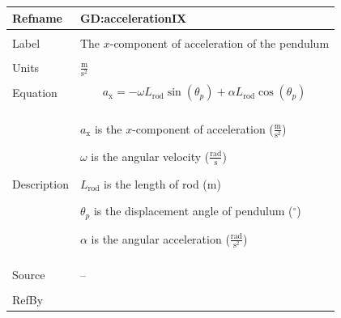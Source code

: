 \documentclass[12pt]{article}
\begin{document}
\vspace{\baselineskip}
\noindent
\begin{minipage}{\textwidth}
\begin{tabular}{>{\raggedright}p{}>{\raggedright\arraybackslash}p{}}
\toprule \textbf{Refname} & \textbf{GD:accelerationIX}
\label{GD:accelerationIX}
\\ \midrule \\
Label & The $x$-component of acceleration of the pendulum
        
\\ \midrule \\
Units & $\frac{\text{m}}{\text{s}^{2}}$
        
\\ \midrule \\
Equation & \begin{displaymath}
           {a_{\text{x}}}=-ω {L_{\text{rod}}} \sin\left({θ_{p}}\right)+α {L_{\text{rod}}} \cos\left({θ_{p}}\right)
           \end{displaymath}
\\ \midrule \\
Description & \begin{symbDescription}
              \item{${a_{\text{x}}}$ is the $x$-component of acceleration ($\frac{\text{m}}{\text{s}^{2}}$)}
              \item{$ω$ is the angular velocity ($\frac{\text{rad}}{\text{s}}$)}
              \item{${L_{\text{rod}}}$ is the length of rod (${\text{m}}$)}
              \item{${θ_{p}}$ is the displacement angle of pendulum (${{}^{\circ}}$)}
              \item{$α$ is the angular acceleration ($\frac{\text{rad}}{\text{s}^{2}}$)}
              \end{symbDescription}
\\ \midrule \\
Source & --
         
\\ \midrule \\
RefBy & 
\\ \bottomrule
\end{tabular}
\end{minipage}
\end{document}

